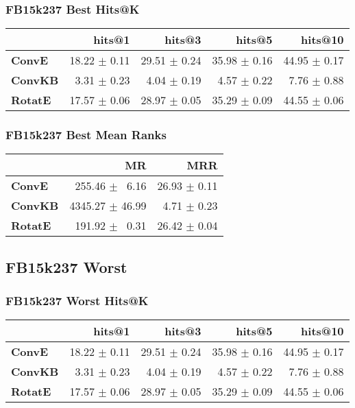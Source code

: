 \documentclass{article}
\begin{document}
\subsubsection{FB15k237 Best Hits@K}
    \begin{center}
    \begin{tabular}{lrrrr}
\toprule
{} &        hits@1 &        hits@3 &        hits@5 &       hits@10 \\
\midrule
\textbf{ConvE } &  18.22 $\pm$ 0.11 &  29.51 $\pm$ 0.24 &  35.98 $\pm$ 0.16 &  44.95 $\pm$ 0.17 \\
\textbf{ConvKB} &  $\phantom{5}$3.31 $\pm$ 0.23 &  $\phantom{5}$4.04 $\pm$ 0.19 &  $\phantom{5}$4.57 $\pm$ 0.22 &  $\phantom{5}$7.76 $\pm$ 0.88 \\
\textbf{RotatE} &  17.57 $\pm$ 0.06 &  28.97 $\pm$ 0.05 &  35.29 $\pm$ 0.09 &  44.55 $\pm$ 0.06 \\
\bottomrule
\end{tabular}

    \end{center}
\subsubsection{FB15k237 Best Mean Ranks}
    \begin{center}
    \begin{tabular}{lrr}
\toprule
{} &               MR &           MRR \\
\midrule
\textbf{ConvE } &  $\phantom{5}$255.46 $\pm$ $\phantom{5}$6.16 &  26.93 $\pm$ 0.11 \\
\textbf{ConvKB} &  4345.27 $\pm$ 46.99 &  $\phantom{5}$4.71 $\pm$ 0.23 \\
\textbf{RotatE} &  $\phantom{5}$191.92 $\pm$ $\phantom{5}$0.31 &  26.42 $\pm$ 0.04 \\
\bottomrule
\end{tabular}

    \end{center}
\subsection{FB15k237 Worst}
\subsubsection{FB15k237 Worst Hits@K}
    \begin{center}
    \begin{tabular}{lrrrr}
\toprule
{} &        hits@1 &        hits@3 &        hits@5 &       hits@10 \\
\midrule
\textbf{ConvE } &  18.22 $\pm$ 0.11 &  29.51 $\pm$ 0.24 &  35.98 $\pm$ 0.16 &  44.95 $\pm$ 0.17 \\
\textbf{ConvKB} &  $\phantom{5}$3.31 $\pm$ 0.23 &  $\phantom{5}$4.04 $\pm$ 0.19 &  $\phantom{5}$4.57 $\pm$ 0.22 &  $\phantom{5}$7.76 $\pm$ 0.88 \\
\textbf{RotatE} &  17.57 $\pm$ 0.06 &  28.97 $\pm$ 0.05 &  35.29 $\pm$ 0.09 &  44.55 $\pm$ 0.06 \\
\bottomrule
\end{tabular}

    \end{center}
\end{document}
